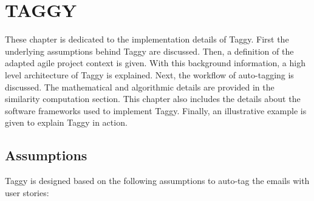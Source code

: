 \fancyhead[RO,LE]{\thepage}
\fancyfoot{} 
\chapter{TAGGY}
These chapter is dedicated to the implementation details of Taggy. First the underlying assumptions behind Taggy are discussed. Then, a definition of the adapted agile project context is given. With this background information, a high level architecture of Taggy is explained. Next, the workflow of auto-tagging is discussed. The mathematical and algorithmic details are provided in the similarity computation section. This chapter also includes the details about the software frameworks used to implement Taggy. Finally, an illustrative example is given to explain Taggy in action.

\section{Assumptions}
Taggy is designed based on the following assumptions to auto-tag the emails with user stories:

